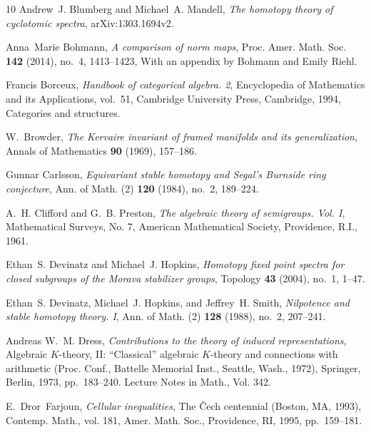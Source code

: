 \documentclass{amsart}
\theoremstyle{definition}
\theoremstyle{remark}
\begin{document}
\begin{thebibliography}{10}
Andrew~J. Blumberg and Michael~A. Mandell, \emph{The homotopy theory of
  cyclotomic spectra}, arXiv:1303.1694v2.

Anna~Marie Bohmann, \emph{A comparison of norm maps}, Proc. Amer. Math. Soc.
  \textbf{142} (2014), no.~4, 1413--1423, With an appendix by Bohmann and Emily
  Riehl. 

Francis Borceux, \emph{Handbook of categorical algebra. 2}, Encyclopedia of
  Mathematics and its Applications, vol.~51, Cambridge University Press,
  Cambridge, 1994, Categories and structures. 

W.~Browder, \emph{The {Kervaire} invariant of framed manifolds and its
  generalization}, Annals of Mathematics \textbf{90} (1969), 157--186.

Gunnar Carlsson, \emph{Equivariant stable homotopy and {S}egal's {B}urnside
  ring conjecture}, Ann. of Math. (2) \textbf{120} (1984), no.~2, 189--224.

A.~H. Clifford and G.~B. Preston, \emph{The algebraic theory of semigroups.
  {V}ol. {I}}, Mathematical Surveys, No. 7, American Mathematical Society,
  Providence, R.I., 1961. 

Ethan~S. Devinatz and Michael~J. Hopkins, \emph{Homotopy fixed point spectra
  for closed subgroups of the {M}orava stabilizer groups}, Topology \textbf{43}
  (2004), no.~1, 1--47. 

Ethan~S. Devinatz, Michael~J. Hopkins, and Jeffrey~H. Smith, \emph{Nilpotence
  and stable homotopy theory. {I}}, Ann. of Math. (2) \textbf{128} (1988),
  no.~2, 207--241. 

Andreas W.~M. Dress, \emph{Contributions to the theory of induced
  representations}, Algebraic {$K$}-theory, {II}: ``{C}lassical'' algebraic
  {$K$}-theory and connections with arithmetic ({P}roc. {C}onf., {B}attelle
  {M}emorial {I}nst., {S}eattle, {W}ash., 1972), Springer, Berlin, 1973,
  pp.~183--240. Lecture Notes in Math., Vol. 342. 

E.~Dror~Farjoun, \emph{Cellular inequalities}, The \v {C}ech centennial
  ({B}oston, {MA}, 1993), Contemp. Math., vol. 181, Amer. Math. Soc.,
  Providence, RI, 1995, pp.~159--181. 


\end{thebibliography}
\end{document}

